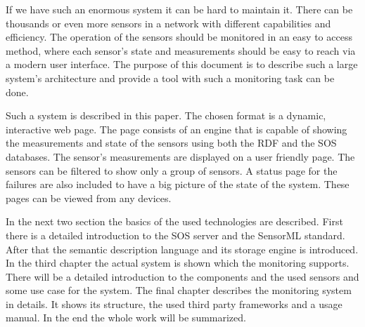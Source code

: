 If we have such an enormous system it can be hard to maintain it. There can be thousands or even more sensors in a network with different capabilities and efficiency. The operation of the sensors should be monitored in an easy to access method, where each sensor's state and measurements should be easy to reach via a modern user interface. The purpose of this document is to describe such a large system's architecture and provide a tool with such a monitoring task can be done.

Such a system is described in this paper. The chosen format is a dynamic, interactive web page. The page consists of an engine that is capable of showing the measurements and state of the sensors using both the RDF and the SOS databases. The sensor's measurements are displayed on a user friendly page. The sensors can be filtered to show only a group of sensors. A status page for the failures are also included to have a big picture of the state of the system. These pages can be viewed from any devices. 

In the next two section the basics of the used technologies are described. First there is a detailed introduction to the SOS server and the SensorML standard. After that the semantic description language and its storage engine is introduced. 
In the third chapter the actual system is shown which the monitoring supports. 
There will be a detailed introduction to the components and the used sensors and some use case for the system. The final chapter describes the monitoring system in details. It shows its structure, the used third party frameworks and a usage manual. In the end the whole work will be summarized. 

